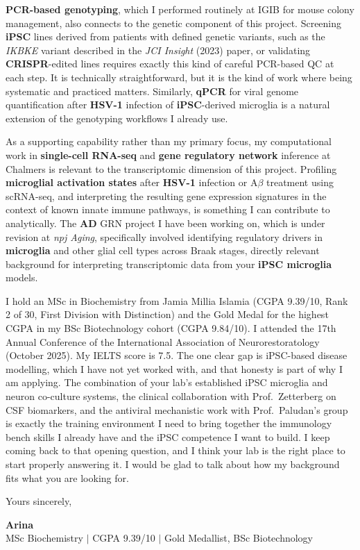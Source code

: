 \documentclass[letterpaper,11pt]{article}
\begin{document}
\vspace{6pt}
\textbf{PCR-based genotyping}, which I performed routinely at IGIB for mouse colony management, also connects to the genetic component of this project. Screening \textbf{iPSC} lines derived from patients with defined genetic variants, such as the \textit{IKBKE} variant described in the \textit{JCI Insight} (2023) paper, or validating \textbf{CRISPR}-edited lines requires exactly this kind of careful PCR-based QC at each step. It is technically straightforward, but it is the kind of work where being systematic and practiced matters. Similarly, \textbf{qPCR} for viral genome quantification after \textbf{HSV-1} infection of \textbf{iPSC}-derived microglia is a natural extension of the genotyping workflows I already use.

\vspace{6pt}
As a supporting capability rather than my primary focus, my computational work in \textbf{single-cell RNA-seq} and \textbf{gene regulatory network} inference at Chalmers is relevant to the transcriptomic dimension of this project. Profiling \textbf{microglial activation states} after \textbf{HSV-1} infection or A$\beta$ treatment using scRNA-seq, and interpreting the resulting gene expression signatures in the context of known innate immune pathways, is something I can contribute to analytically. The \textbf{AD} GRN project I have been working on, which is under revision at \textit{npj Aging}, specifically involved identifying regulatory drivers in \textbf{microglia} and other glial cell types across Braak stages, directly relevant background for interpreting transcriptomic data from your \textbf{iPSC microglia} models.

\vspace{6pt}
I hold an MSc in Biochemistry from Jamia Millia Islamia (CGPA 9.39/10, Rank 2 of 30, First Division with Distinction) and the Gold Medal for the highest CGPA in my BSc Biotechnology cohort (CGPA 9.84/10). I attended the 17th Annual Conference of the International Association of Neurorestoratology (October 2025). My IELTS score is 7.5. The one clear gap is iPSC-based disease modelling, which I have not yet worked with, and that honesty is part of why I am applying. The combination of your lab's established iPSC microglia and neuron co-culture systems, the clinical collaboration with Prof.\ Zetterberg on CSF biomarkers, and the antiviral mechanistic work with Prof.\ Paludan's group is exactly the training environment I need to bring together the immunology bench skills I already have and the iPSC competence I want to build. I keep coming back to that opening question, and I think your lab is the right place to start properly answering it. I would be glad to talk about how my background fits what you are looking for.

\vspace{10pt}
Yours sincerely,

\vspace{16pt}
\textbf{Arina}\\
\small MSc Biochemistry $|$ CGPA 9.39/10 $|$ Gold Medallist, BSc Biotechnology
\end{document}
